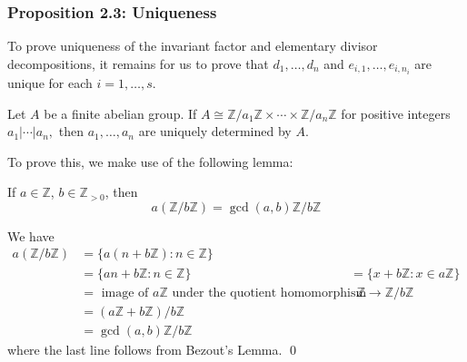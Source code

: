 \documentclass{article}
\renewenvironment{proof}{{\bfseries\color{blue1} Proof:}}{\qed}
\begin{document}
\subsubsection{Proposition 2.3: Uniqueness}
To prove uniqueness of the invariant factor and elementary divisor decompositions, it remains for us to prove that $d_1,\dots,d_n$ and $e_{i,1},\dots,e_{i,n_i}$ are unique for each $i=1,\dots, s$.
\begin{idea}
    Let $A$ be a finite abelian group. If $A \cong \mathbb{Z}/a_1\mathbb{Z} \times \cdots \times \mathbb{Z}/a_n \mathbb{Z}$ for positive integers $a_1|\cdots | a_n,$ then $a_1,\dots,a_n$ are uniquely determined by $A$.
\end{idea}
To prove this, we make use of the following lemma:
\begin{idea}
    If $a\in \mathbb{Z}$, $b\in \mathbb{Z}_{>0}$, then
    \begin{equation*}
        a(\mathbb{Z}/b\mathbb{Z}) = \gcd(a,b)\mathbb{Z}/b\mathbb{Z}
    \end{equation*}
\end{idea}
\begin{proof}
    We have
    \begin{align*}
        a(\mathbb{Z}/b\mathbb{Z}) & = \{a(n+b\mathbb{Z}): n\in \mathbb{Z} \}                                                                       \\
                                  & = \{an+b\mathbb{Z} : n \in \mathbb{Z}\}
                                  & = \{x+b\mathbb{Z} : x\in a\mathbb{Z}\}                                                                         \\
                                  & = \text{ image of $a\mathbb{Z}$ under the quotient homomorphism }\mathbb{Z} \rightarrow \mathbb{Z}/b\mathbb{Z} \\
                                  & = (a\mathbb{Z}+b\mathbb{Z})/b\mathbb{Z}                                                                        \\
                                  & = \gcd(a,b)\mathbb{Z}/b\mathbb{Z}
    \end{align*}
    where the last line follows from Bezout's Lemma.
\end{proof}
\end{document}
